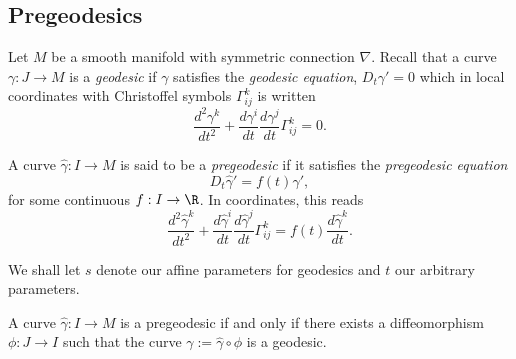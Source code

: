 \subsection{Pregeodesics}
Let $M$ be a smooth manifold with symmetric connection $\nabla$.  Recall that a curve $\gamma:J\to M$ is a \textit{geodesic} if $\gamma$ satisfies the \textit{geodesic equation}, $D_t\gamma'=0$ which in local coordinates with Christoffel symbols $\Gamma_{ij}^k$ is written
\begin{equation}\label{eq:geoEqun}
\frac{d^2\gamma^k}{dt^2}+\frac{d\gamma^i}{dt}\frac{d\gamma^j}{dt}\Gamma_{ij}^k=0.	
\end{equation}


A curve $\hat{\gamma}:I\to M$ is said to be a \textit{pregeodesic} if it satisfies the \textit{pregeodesic equation}
$$D_t\hat{\gamma}'=f(t)\hat{\gamma}',$$
for some continuous $f:I\to\R$.  In coordinates, this reads
\begin{equation}\label{eq:pregeoEqunGen}
\frac{d^2\hat{\gamma}^k}{dt^2}+\frac{d\hat{\gamma}^i}{dt}\frac{d\hat{\gamma}^j}{dt}\Gamma_{ij}^k=f(t)\frac{d\hat{\gamma}^k}{dt}.	
\end{equation}


We shall let $s$ denote our affine parameters for geodesics and $t$ our arbitrary parameters.

\begin{prop}
    A curve $\hat{\gamma}:I\to M$ is a pregeodesic if and only if there exists a diffeomorphism $\phi:J\to I$ such that the curve $\gamma:=\hat{\gamma}\circ\phi$ is a geodesic.
\end{prop}


